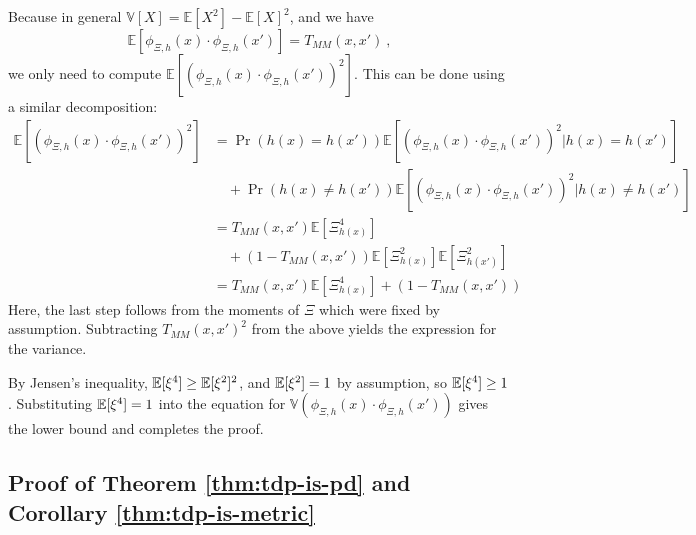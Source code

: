     Because in general $\mathbb{V}[X]=\mathbb{E}[X^2]-\mathbb{E}[X]^2$,
    and we have
    \begin{equation*}
    \mathbb{E}\left[ \phi_{\Xi,h}(x)\cdot \phi_{\Xi,h}(x')\right]=T_{MM}(x,x')  \ ,
    \end{equation*}
    we only need to compute
    $\mathbb{E}\left[ \left(\phi_{\Xi,h}(x)\cdot \phi_{\Xi,h}(x')\right)^2\right]$.
    This can be done using a similar decomposition:
    \begin{align*}
        \mathbb{E}\left[ \left(\phi_{\Xi,h}(x)\cdot \phi_{\Xi,h}(x')\right)^2\right]&= \Pr(h(x)=h(x')) \mathbb{E}\left[ \left(\phi_{\Xi,h}(x)\cdot \phi_{\Xi,h}(x')\right)^2|h(x)=h(x')\right] \nonumber \\
        &\quad + \Pr(h(x)\neq h(x')) \mathbb{E}\left[ \left(\phi_{\Xi,h}(x)\cdot \phi_{\Xi,h}(x')\right)^2|h(x)\neq h(x')\right] \\
        &= T_{MM}(x,x') \mathbb{E}\left[ \Xi_{h(x)}^4 \right] \nonumber \\
        &\quad + \left(1-T_{MM}(x,x')\right) \mathbb{E}\left[ \Xi_{h(x)}^2 \right] \mathbb{E}\left[ \Xi_{h(x')}^2 \right] \\
        &= T_{MM}(x,x') \mathbb{E}\left[ \Xi_{h(x)}^4 \right] + \left(1-T_{MM}(x,x')\right) 
    \end{align*}
    Here, the last step follows from the moments of $\Xi$ which were fixed by assumption.
    Subtracting $T_{MM}(x,x')^2$ from the above yields the expression for the variance.

By Jensen's inequality, $\mathbb{E}[\xi^4]\geq \mathbb{E}[\xi^2]^2$, and $\mathbb{E}[\xi^2]=1$ by assumption, so $\mathbb{E}[\xi^4]\geq1$.
    Substituting $\mathbb{E}[\xi^4]=1$ into the equation for $\mathbb{V}(\phi_{\Xi,h}(x)\cdot \phi_{\Xi,h}(x'))$ gives the lower bound and completes the proof.

\subsection{Proof of Theorem \ref{thm:tdp-is-pd} and Corollary \ref{thm:tdp-is-metric}}\label{apdx:tdp-is-pd-proof}

